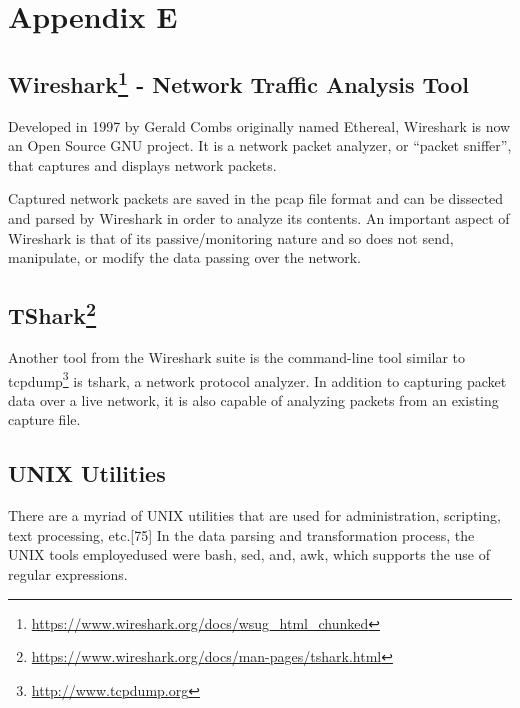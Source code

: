 \documentclass[11pt,]{article}
\begin{document}
\newpage

\section*{Appendix E}\label{appendix-e}

\subsection*{Wireshark\footnote{\url{https://www.wireshark.org/docs/wsug_html_chunked}}
- Network Traffic Analysis
Tool}\label{wireshark5---network-traffic-analysis-tool}

Developed in 1997 by Gerald Combs originally named Ethereal, Wireshark
is now an Open Source GNU project. It is a network packet analyzer, or
``packet sniffer'', that captures and displays network packets.

Captured network packets are saved in the pcap file format and can be
dissected and parsed by Wireshark in order to analyze its contents. An
important aspect of Wireshark is that of its passive/monitoring nature
and so does not send, manipulate, or modify the data passing over the
network.

\subsection*{TShark\footnote{\url{https://www.wireshark.org/docs/man-pages/tshark.html}}}\label{tshark6}

Another tool from the Wireshark suite is the command-line tool similar
to tcpdump\footnote{\url{http://www.tcpdump.org}} is tshark, a network
protocol analyzer. In addition to capturing packet data over a live
network, it is also capable of analyzing packets from an existing
capture file.

\subsection*{UNIX Utilities}\label{unix-utilities}

There are a myriad of UNIX utilities that are used for administration,
scripting, text processing, etc.{[}75{]} In the data parsing and
transformation process, the UNIX tools employedused were bash, sed, and,
awk, which supports the use of regular expressions.
\end{document}

